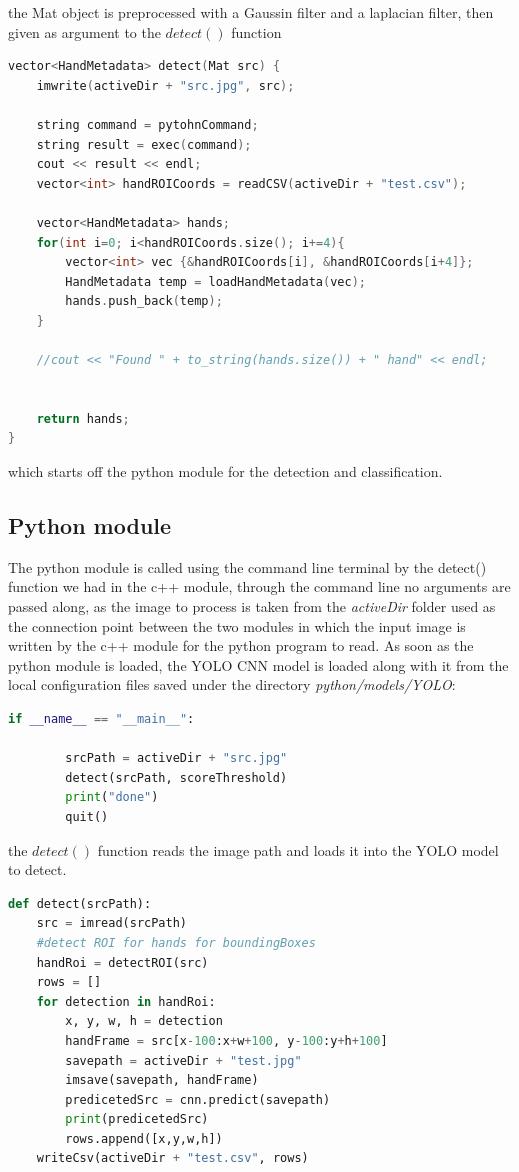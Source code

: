 the Mat object is preprocessed with a Gaussin filter and a laplacian filter, then given as argument to the $detect()$ function

\begin{lstlisting}[language = c++]
    vector<HandMetadata> detect(Mat src) {
    imwrite(activeDir + "src.jpg", src);

    string command = pytohnCommand;
    string result = exec(command);
    cout << result << endl;
    vector<int> handROICoords = readCSV(activeDir + "test.csv");

    vector<HandMetadata> hands;
    for(int i=0; i<handROICoords.size(); i+=4){
        vector<int> vec {&handROICoords[i], &handROICoords[i+4]};
        HandMetadata temp = loadHandMetadata(vec);
        hands.push_back(temp);
    }
    
    //cout << "Found " + to_string(hands.size()) + " hand" << endl;
    
    
    return hands;
}
\end{lstlisting}

which starts off the python module for the detection and classification. 

\subsection{Python module}
The python module is called using the command line terminal by the detect() function we had in the c++ module, through the command line no arguments are passed along,
as the image to process is taken from the \textit{activeDir} folder used as the connection point between the two modules in which the input image is written by the 
c++ module for the python program to read. As soon as the python module is loaded, the YOLO CNN model is loaded along with it from the local configuration files
saved under the directory \textit{python/models/YOLO}:

\begin{lstlisting}[language=python]
    if __name__ == "__main__":

        srcPath = activeDir + "src.jpg"
        detect(srcPath, scoreThreshold)
        print("done")
        quit()
\end{lstlisting}

the $detect()$ function reads the image path and loads it into the YOLO model to detect. 

\begin{lstlisting}[language=python]
    def detect(srcPath):
    src = imread(srcPath)
    #detect ROI for hands for boundingBoxes
    handRoi = detectROI(src)
    rows = []
    for detection in handRoi:
        x, y, w, h = detection
        handFrame = src[x-100:x+w+100, y-100:y+h+100]
        savepath = activeDir + "test.jpg"
        imsave(savepath, handFrame)
        predicetedSrc = cnn.predict(savepath)
        print(predicetedSrc)
        rows.append([x,y,w,h])
    writeCsv(activeDir + "test.csv", rows)
\end{lstlisting}

